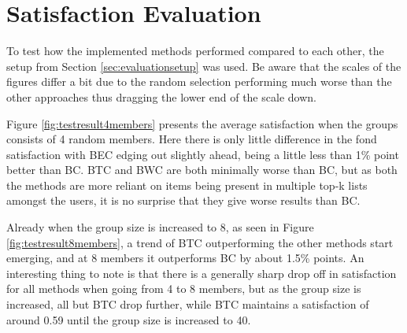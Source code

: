 \section{Satisfaction Evaluation} \label{sec:satisfationevaluation}

To test how the implemented methods performed compared to each other, the setup from Section \ref{sec:evaluationsetup} was used. Be aware that the scales of the figures differ a bit due to the random selection performing much worse than the other approaches thus dragging the lower end of the scale down.

Figure \ref{fig:testresult4members} presents the average satisfaction when the groups consists of 4 random members. Here there is only little difference in the fond satisfaction with BEC edging out slightly ahead, being a little less than 1\% point better than BC. BTC and BWC are both minimally worse than BC, but as both the methods are more reliant on items being present in multiple top-k lists amongst the users, it is no surprise that they give worse results than BC.

Already when the group size is increased to 8, as seen in Figure \ref{fig:testresult8members}, a trend of BTC outperforming the other methods start emerging, and at 8 members it outperforms BC by about 1.5\% points. An interesting thing to note is that there is a generally sharp drop off in satisfaction for all methods when going from 4 to 8 members, but as the group size is increased, all but BTC drop further, while BTC maintains a satisfaction of around 0.59 until the group size is increased to 40.

